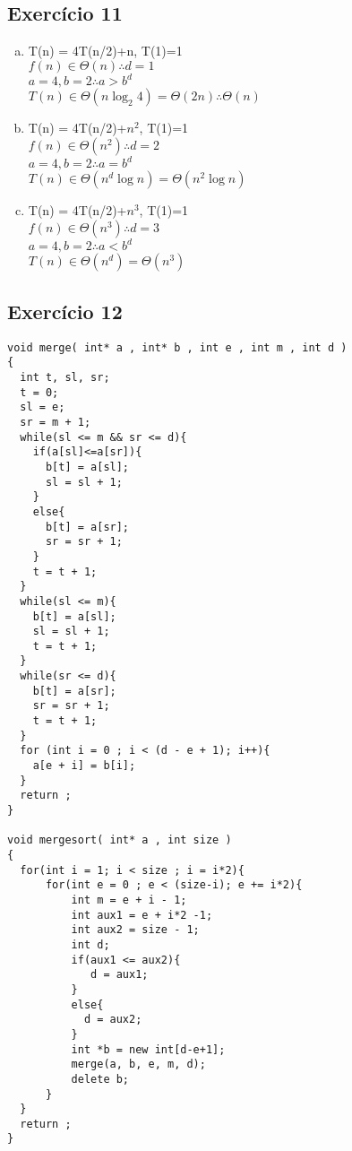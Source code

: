 \subsection{Exercício 11}\label{sec:exer11}

\begin{enumerate}[a)]
  \item T(n) = 4T(n/2)+n, T(1)=1 \\
  $f(n) \in \Theta(n) \therefore d=1$ \\
  $a = 4, b = 2 \therefore a>b^{d}$ \\
  $T(n) \in \Theta(n\log_{2}4) = \Theta(2n) \therefore \Theta(n)$
  \item T(n) = 4T(n/2)+$n^{2}$, T(1)=1 \\
  $f(n) \in \Theta(n^{2}) \therefore d=2$ \\
  $a = 4, b = 2 \therefore a=b^{d}$ \\
  $T(n) \in \Theta(n^{d} \log{}n) = \Theta(n^{2} \log{}n)$
  \item T(n) = 4T(n/2)+$n^{3}$, T(1)=1 \\
  $f(n) \in \Theta(n^{3}) \therefore d=3$ \\
  $a = 4, b = 2 \therefore a<b^{d}$ \\
  $T(n) \in \Theta(n^{d}) = \Theta(n^{3})$
\end{enumerate}

\subsection{Exercício 12}\label{sec:exer12}

\begin{lstlisting}
void merge( int* a , int* b , int e , int m , int d )
{
  int t, sl, sr;
  t = 0;
  sl = e;
  sr = m + 1;
  while(sl <= m && sr <= d){
    if(a[sl]<=a[sr]){
      b[t] = a[sl];
      sl = sl + 1;
    }
    else{
      b[t] = a[sr];
      sr = sr + 1;
    }
    t = t + 1;
  }
  while(sl <= m){
    b[t] = a[sl];
    sl = sl + 1;
    t = t + 1;
  }
  while(sr <= d){
    b[t] = a[sr];
    sr = sr + 1;
    t = t + 1;
  }
  for (int i = 0 ; i < (d - e + 1); i++){
    a[e + i] = b[i];
  }
  return ;
}

void mergesort( int* a , int size )
{  
  for(int i = 1; i < size ; i = i*2){
      for(int e = 0 ; e < (size-i); e += i*2){
          int m = e + i - 1;
          int aux1 = e + i*2 -1;
          int aux2 = size - 1;
          int d;
          if(aux1 <= aux2){
             d = aux1;
          }
          else{
            d = aux2;
          }
          int *b = new int[d-e+1];
          merge(a, b, e, m, d);
          delete b;
      } 
  }
  return ;
}
\end{lstlisting}

